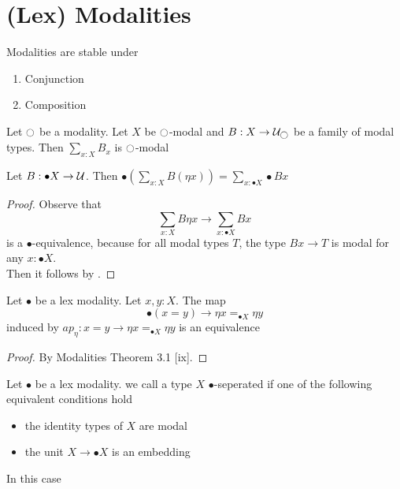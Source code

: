 
\section{(Lex) Modalities}
\begin{lemma}{\label{lemma:ModalityStability}}
	Modalities are stable under 
	\begin{enumerate}
		\item Conjunction
		\item Composition
	\end{enumerate}
	
\end{lemma}
\begin{lemma}{\label{lemma:ModalitySumStable}}
	Let $\ci$ be a modality. Let $X$ be $\ci$-modal and $B : X \to \cU_{\ci}$ be a family of modal types. Then $\sum_{x : X} B_x$ is $\ci$-modal
\end{lemma}
\begin{lemma}{\label{lemma:mod_comm_sum}}
	Let $B  : \bullet X \to \mathcal{U}$. Then $\bullet (\sum_{x : X} B (\eta x)) = \sum_{x : \bullet X} \bullet B x$
\end{lemma}
\begin{proof}
	Observe that 
	\[
	\sum_{x : X} B \eta x \to \sum_{x : \bullet X} B x
	\]
	is a $\bullet$-equivalence, because for all modal types $T$, the type $B x \to T$ is modal for any $x : \bullet X$. \\
	Then it follows by \todocite.
\end{proof}
\begin{lemma}{\label{lemma:idTypesOfSheafification}}
	Let $\bullet$ be a lex modality. Let $x , y : X$. The map
	\[
	\bullet(x = y) \to \eta x =_{\bullet X} \eta y
	\]
	induced by $ap_\eta : x = y \to \eta x =_{\bullet X} \eta y$ is an equivalence
\end{lemma}
\begin{proof}
 	By Modalities Theorem 3.1 [ix].
\end{proof}
\begin{definition}{\label{lemma:sep}}
	Let $\bullet$ be a lex modality. we call a type $X$ $\bullet$-seperated if one of the following equivalent conditions hold
	\begin{itemize}
		\item the identity types of $X$ are modal
		\item the unit $X \to \bullet X$ is an embedding
	\end{itemize}
In this case
\end{definition}
